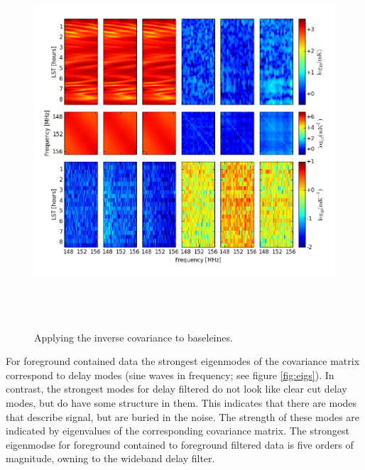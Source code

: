 \documentclass[twocolumn,numberedappendix]{emulateapj} \shorttitle{PSA64}
\begin{document}
\begin{figure}[h!]\centering
\includegraphics[width=2\columnwidth, height=5.5in]{plots/inv_cov.png}
\caption{Applying the inverse covariance to baseleines.}
\label{fig:inv_cov}
\end{figure}

For foreground contained data the strongest eigenmodes of the covariance matrix
correspond to delay modes (sine waves in frequency; see figure \ref{fig:eigs}).
In contrast, the strongest modes for delay filtered do not look like clear cut
delay modes, but do have some structure in them. This indicates that there are
modes that describe signal, but are buried in the noise. The strength of these
modes are indicated by eigenvalues of the corresponding covariance matrix. The
strongest eigenmodse for foreground contained to foreground filtered data is
five orders of magnitude, owning to the wideband delay filter.
\end{document}
